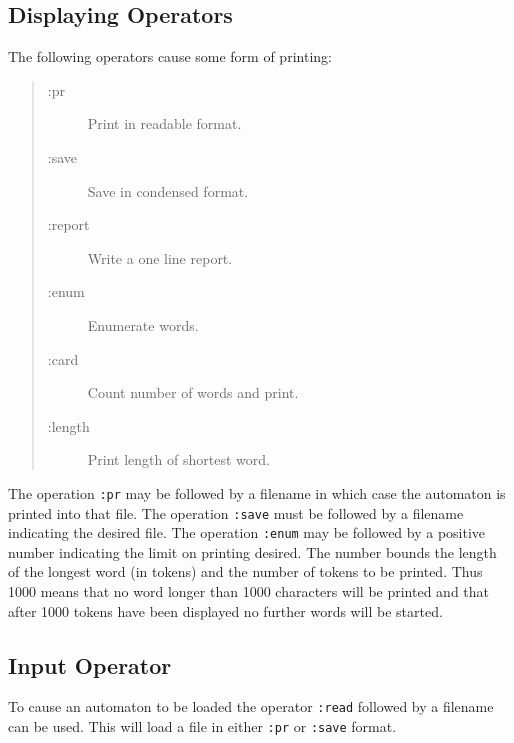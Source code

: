 \subsection{Displaying Operators}
The following operators cause some form of printing:
\begin{quote}
\begin{description}
\item[:pr] Print in readable format.
\item[:save] Save in condensed format.
\item[:report] Write a one line report.
\item[:enum] Enumerate words.
\item[:card] Count number of words and print.
\item[:length] Print length of shortest word.
\end{description}
\end{quote}
The operation \verb#:pr# may be followed by a filename in which case the
automaton is printed into that file.
The operation \verb#:save# must be followed by a filename indicating the
desired file.
The operation \verb#:enum# may be followed by a positive number indicating
the limit on printing desired.
The number bounds the length of the longest word (in tokens) and the number
of tokens to be printed.
Thus 1000 means that no word longer than 1000 characters will be printed
and that after 1000 tokens have been displayed no further words will be
started.

\subsection{Input Operator}
To cause an automaton to be loaded the operator \verb#:read# followed by a
filename can be used.
This will load a file in either \verb#:pr# or \verb#:save# format.
